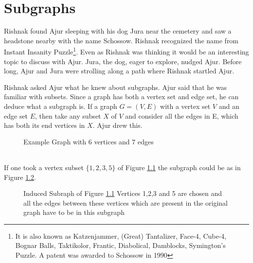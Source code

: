 \chapter{Subgraphs}
Rishnak found Ajur sleeping with his dog Jura near the cemetery and saw a headstone nearby with the name Schossow. Rishnak recognized the name  from Instant Insanity Puzzle{\footnote{It is also known as Katzenjammer, (Great) Tantalizer, Face-4, Cube-4, Bognar Balls, Taktikolor, Frantic, Diabolical, Damblocks,
Symington's Puzzle. A patent was awarded to  Schossow in 1990}}. Even as Rishnak was thinking it would be an interesting topic to discuss with Ajur. Jura, the dog, eager to explore, nudged Ajur. Before long, Ajur and Jura were strolling along a path where Rishnak startled Ajur. 

Rishnak asked Ajur what he knew about subgraphs. Ajur said that he was familiar with subsets. Since a graph has both a vertex set and edge set, he can deduce what a subgraph is. If a graph $G=(V,E)$ with a vertex set $V$ and an edge set $E$, then take any subset $X$ of $V$ and consider all the edges in E, which has both its end vertices in $X$. Ajur drew this.
\vspace{0.2in}
\\
\noindent
\begin{figure}
\begin{center}
\caption{ Example Graph with 6 vertices and 7 edges}\label{3g}
\end{center}
\end{figure}
\\
\noindent
If one took a vertex subset $\{1,2,3,5\}$ of Figure \ref{3g} the subgraph could be as in Figure \ref{3g1}.
\begin{figure}
\begin{center}
\caption{Induced Subraph of Figure \ref{3g} Vertices 1,2,3 and 5 are chosen and all the edges between these vertices which are present in the original graph have to be in this subgraph}\label{3g1}
\end{center}
\end{figure}
